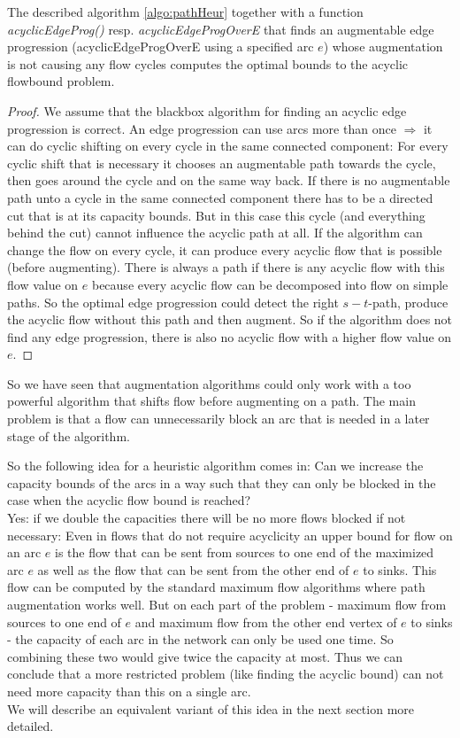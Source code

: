 \begin{prop}
 The described algorithm \ref{algo:pathHeur} together with a function \textit{acyclicEdgeProg()} 
 resp. \textit{acyclicEdgeProgOverE} 
 that finds an augmentable edge progression (acyclicEdgeProgOverE using a specified arc $e$)
 whose augmentation is not causing any flow cycles computes the optimal bounds to the acyclic flowbound problem. 
\end{prop}
\begin{proof}
 We assume that the blackbox algorithm for finding an acyclic edge progression is correct. An edge progression can use
 arcs more than once $\Rightarrow$ it can do cyclic shifting on every cycle in the same connected component: 
 For every cyclic shift that is necessary it chooses an augmentable path towards the cycle, then goes around the cycle 
 and on the same way back. If there is no augmentable path unto a cycle in the same connected component there has to be
 a directed cut that is at its capacity bounds. But in this case this cycle (and everything behind the cut) cannot 
 influence the acyclic path at all.
 If the algorithm can change the flow on every cycle, it can produce every acyclic flow that is possible (before augmenting).
 There is always a path if there is any acyclic flow with this flow value on $e$ because every acyclic flow can be 
 decomposed into flow on simple paths. So the optimal edge progression could detect the right $s-t$-path, produce the 
 acyclic flow without this path and then augment. So if the algorithm does not find any edge progression, there 
 is also no acyclic flow with a higher flow value on $e$.  
\end{proof}

So we have seen that augmentation algorithms could only work with a too powerful algorithm that shifts flow before 
augmenting on a path. The main problem is that a flow can unnecessarily block an arc that is needed in a later stage 
of the algorithm. 

So the following idea for a heuristic algorithm comes in: Can we increase the capacity bounds of the arcs in a way 
such that they can only be blocked in the case when the acyclic flow bound is reached?\\

Yes: if we double the capacities there will be no more flows blocked if not necessary: Even in flows that do not 
require acyclicity an upper bound for flow on an arc $e$ is the flow that can be sent from sources to one end of the 
maximized arc $e$ as well as the flow that can be sent from the other end of $e$ to sinks. This flow can be computed by 
the standard maximum flow algorithms where path augmentation works well. But on each part of the problem - maximum flow 
from sources to one end of $e$ and maximum flow from the other end vertex of $e$ to sinks - the capacity of each arc in 
the network can only be used one time. So combining these two would give twice the capacity at most. Thus we can 
conclude that a more restricted problem (like finding the acyclic bound) can not need more capacity than this on a 
single arc.\\

We will describe an equivalent variant of this idea in the next section more detailed.
 


